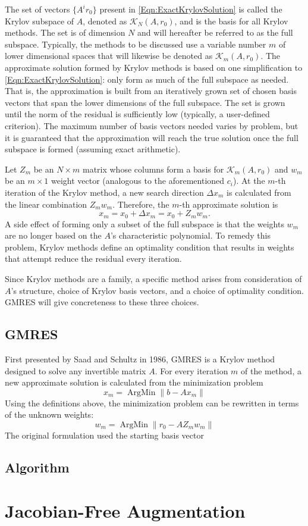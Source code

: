 \documentclass[Prelim,12pt]{WisconsinThesis}
\newcommand{\by}    {\!\times\!}
\DeclareMathOperator*{\ArgMin}{ArgMin}
\begin{document}
The set of vectors $\{A^i r_0\}$ present in \cref{Eqn:ExactKrylovSolution} is called the Krylov subspace of $A$, denoted as $\mathcal{K}_N(A,r_0)$, and is the basis for all Krylov methods.
The set is of dimension $N$ and will hereafter be referred to as the full subspace.
Typically, the methods to be discussed use a variable number $m$ of lower dimensional spaces that will likewise be denoted as $\mathcal{K}_m(A,r_0)$.
The approximate solution formed by Krylov methods is based on one simplification to \cref{Eqn:ExactKrylovSolution}: only form as much of the full subspace as needed.
That is, the approximation is built from an iteratively grown set of chosen basis vectors that span the lower dimensions of the full subspace.
The set is grown until the norm of the residual is sufficiently low (typically, a user-defined criterion).
The maximum number of basis vectors needed varies by problem, but it is guaranteed that the approximation will reach the true solution once the full subspace is formed (assuming exact arithmetic).


Let $Z_m$ be an $N \by m$ matrix whose columns form a basis for $\mathcal{K}_m(A,r_0)$ and $w_m$ be an $m \by 1$ weight vector (analogous to the aforementioned $c_i$).
At the $m$-th iteration of the Krylov method, a new search direction $\Delta{x}_m$ is calculated from the linear combination $Z_m w_m$.
Therefore, the $m$-th approximate solution is
\begin{equation}
    x_m = x_0 + \Delta{x}_m = x_0 + Z_m w_m.
    \label{Eqn:ApproximateKrylovSolution}
\end{equation}
A side effect of forming only a subset of the full subspace is that the weights $w_m$ are no longer based on the $A$'s characteristic polynomial.
To remedy this problem, Krylov methods define an optimality condition that results in weights that attempt reduce the residual every iteration.

Since Krylov methods are a family, a specific method arises from consideration of $A$'s structure, choice of Krylov basis vectors, and a choice of optimality condition.
GMRES will give concreteness to these three choices.


\subsection{GMRES}
First presented by Saad and Schultz in 1986, GMRES is a Krylov method designed to solve any invertible matrix $A$.
For every iteration $m$ of the method, a new approximate solution is calculated from the minimization problem
\begin{equation}
    x_m = \ArgMin\|b - A x_m\|
\end{equation}
Using the definitions above, the minimization problem can be rewritten in terms of the unknown weights:
\begin{equation}
    w_m = \ArgMin\|r_0 - A Z_m w_m\| 
\end{equation}
The original formulation used the starting basis vector $ $


\subsection{Algorithm}


\section{Jacobian-Free Augmentation}
\end{document}
